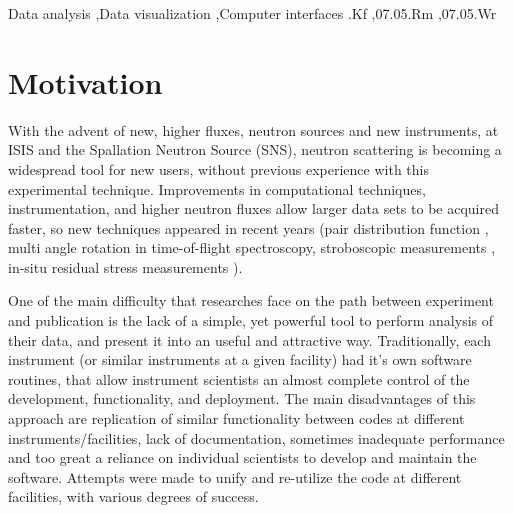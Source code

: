 \documentclass{elsarticle}
\begin{document}
\begin{frontmatter}
\begin{keyword}
Data analysis \sep Data visualization \sep Computer interfaces
.Kf 	%
\sep 07.05.Rm 	%
\sep 07.05.Wr 	%
\end{keyword}
\end{frontmatter}

\section{Motivation}
\label{motivation}
With the advent of new, higher fluxes, neutron sources and new instruments, at ISIS and the Spallation Neutron Source (SNS), 
neutron scattering is becoming a widespread tool for new users, without previous experience with this experimental technique. Improvements in computational techniques, instrumentation, and higher neutron fluxes allow larger data sets to be acquired faster, so new techniques appeared in recent years (pair distribution function \cite{Egami}, multi angle rotation in time-of-flight spectroscopy, stroboscopic measurements \cite{Nojiri}, in-situ residual stress measurements \cite{Wang}). 

One of the main difficulty that researches face on the path between experiment and publication
is the lack of a simple, yet powerful tool to perform analysis of their data,
and present it into an useful and attractive way.
Traditionally, each instrument (or similar instruments at a given facility) had it's own software routines, that allow instrument scientists an almost complete control of the development, functionality, and deployment. 
The main disadvantages of this approach are replication of similar functionality between codes at different instruments/facilities, lack of documentation, sometimes inadequate performance and too great a reliance on individual scientists to develop and maintain the software. Attempts were made to unify and re-utilize the code at different facilities, \cite{DAVE, OpenGenie, LAMP, ISAW} with various degrees of success. 
\end{document}
